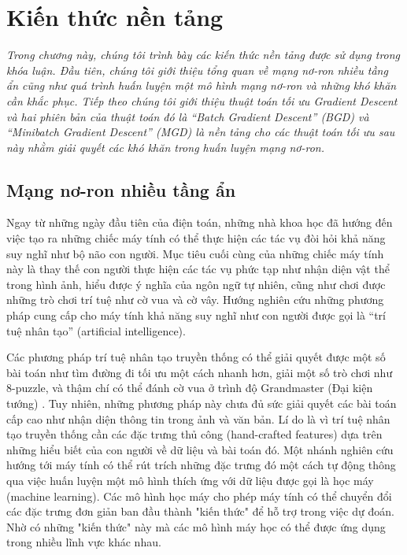 \chapter{Kiến thức nền tảng}
\label{Chapter2}

\textit{Trong chương này, chúng tôi trình bày các kiến thức nền tảng được sử dụng trong khóa luận. Đầu tiên, chúng tôi giới thiệu tổng quan về mạng nơ-ron nhiều tầng ẩn cũng như quá trình huấn luyện một mô hình mạng nơ-ron và những khó khăn cần khắc phục. Tiếp theo chúng tôi giới thiệu thuật toán tối ưu Gradient Descent và hai phiên bản của thuật toán đó là ``Batch Gradient Descent'' (BGD) và ``Minibatch Gradient Descent'' (MGD) là nền tảng cho các thuật toán tối ưu sau này nhằm giải quyết các khó khăn trong huấn luyện mạng nơ-ron.}

\section{Mạng nơ-ron nhiều tầng ẩn}

Ngay từ những ngày đầu tiên của điện toán, những nhà khoa học đã hướng đến việc tạo ra những chiếc máy tính có thể thực hiện các tác vụ đòi hỏi khả năng suy nghĩ như bộ não con người. Mục tiêu cuối cùng của những chiếc máy tính này là thay thế con người thực hiện các tác vụ phức tạp như nhận diện vật thể trong hình ảnh, hiểu được ý nghĩa của ngôn ngữ tự nhiên, cũng như chơi được những trò chơi trí tuệ như cờ vua và cờ vây. Hướng nghiên cứu những phương pháp cung cấp cho máy tính khả năng suy nghĩ như con người được gọi là ``trí tuệ nhân tạo'' (artificial intelligence).

Các phương pháp trí tuệ nhân tạo truyền thống có thể giải quyết được một số bài toán như tìm đường đi tối ưu một cách nhanh hơn, giải một số trò chơi như 8-puzzle, và thậm chí có thể đánh cờ vua ở trình độ Grandmaster (Đại kiện tướng) \cite{campbell2001deepblue}. Tuy nhiên, những phương pháp này chưa đủ sức giải quyết các bài toán cấp cao như nhận diện thông tin trong ảnh và văn bản. Lí do là vì trí tuệ nhân tạo truyền thống cần các đặc trưng thủ công (hand-crafted features) dựa trên những hiểu biết của con người về dữ liệu và bài toán đó. Một nhánh nghiên cứu hướng tới máy tính có thể rút trích những đặc trưng đó một cách tự động thông qua việc huấn luyện một mô hình thích ứng với dữ liệu được gọi là học máy (machine learning). Các mô hình học máy cho phép máy tính có thể chuyển đổi các đặc trưng đơn giản ban đầu thành "kiến thức" để hỗ trợ trong việc dự đoán. Nhờ có những "kiến thức" này mà các mô hình máy học có thể được ứng dụng trong nhiều lĩnh vực khác nhau.

